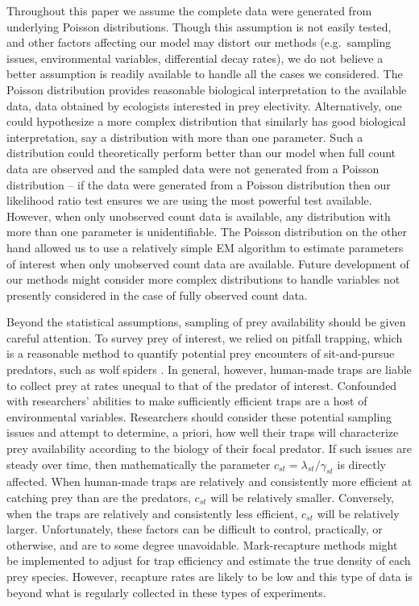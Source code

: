 \documentclass[smallextended]{svjour3}
\begin{document}
Throughout this paper we assume the complete data were generated from underlying Poisson distributions.  Though this assumption is not easily tested, and other factors affecting our model may distort our methods (e.g.\ sampling issues, environmental variables, differential decay rates), we do not believe a better assumption is readily available to handle all the cases we considered.  The Poisson distribution provides reasonable biological interpretation to the available data, data obtained by ecologists interested in prey electivity.  Alternatively, one could hypothesize a more complex distribution that similarly has good biological interpretation, say a distribution with more than one parameter.  Such a distribution could theoretically perform better than our model when full count data are observed and the sampled data were not generated from a Poisson distribution -- if the data were generated from a Poisson distribution then our likelihood ratio test ensures we are using the most powerful test available.  However, when only unobserved count data is available, any distribution with more than one parameter is unidentifiable.  The Poisson distribution on the other hand allowed us to use a relatively simple EM algorithm to estimate parameters of interest when only unobserved count data are available.  Future development of our methods might consider more complex distributions to handle variables not presently considered in the case of fully observed count data.

Beyond the statistical assumptions, sampling of prey availability should be given careful attention.  To survey prey of interest, we relied on pitfall trapping, which is a reasonable method to quantify potential prey encounters of sit-and-pursue predators, such as wolf spiders \citep{Uetz:1999}.  In general, however, human-made traps are liable to collect prey at rates unequal to that of the predator of interest.  Confounded with researchers' abilities to make sufficiently efficient traps are a host of environmental variables.  Researchers should consider these potential sampling issues and attempt to determine, a priori, how well their traps will characterize prey availability according to the biology of their focal predator.  If such issues are steady over time, then mathematically the parameter $c_{st} = \lambda_{st}/\gamma_{st}$ is directly affected.  When human-made traps are relatively and consistently more efficient at catching prey than are the predators, $c_{st}$ will be relatively smaller.  Conversely, when the traps are relatively and consistently less efficient, $c_{st}$ will be relatively larger.  Unfortunately, these factors can be difficult to control, practically, or otherwise, and are to some degree unavoidable.  Mark-recapture methods might be implemented to adjust for trap efficiency and estimate the true density of each prey species.  However, recapture rates are likely to be low and this type of data is beyond what is regularly collected in these types of experiments. 
\end{document}
